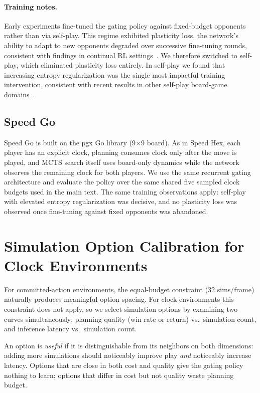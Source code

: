 \paragraph{Training notes.}
Early experiments fine-tuned the gating policy against fixed-budget opponents rather
than via self-play.
This regime exhibited plasticity loss, the network's ability to adapt to new opponents
degraded over successive fine-tuning rounds, consistent with findings in continual RL
settings~\citep{muppidi2024fast, boopathy2024permutation}.
We therefore switched to self-play, which eliminated plasticity loss entirely.
In self-play we found that increasing entropy regularization was the single most
impactful training intervention, consistent with recent results in other self-play
board-game domains~\citep{forkel2025entropy}.

\subsection{Speed Go}
Speed Go is built on the pgx Go library (9$\times$9 board).
As in Speed Hex, each player has an explicit clock, planning consumes clock only
after the move is played, and MCTS search itself uses board-only dynamics while the
network observes the remaining clock for both players.
We use the same recurrent gating architecture and evaluate the policy over the same
shared five sampled clock budgets used in the main text.
The same training observations apply: self-play with elevated entropy regularization
was decisive, and no plasticity loss was observed once fine-tuning against fixed
opponents was abandoned.


\section{Simulation Option Calibration for Clock Environments}
\label{app:sim_calibration}

For committed-action environments, the equal-budget constraint (32 sims/frame) naturally
produces meaningful option spacing.
For clock environments this constraint does not apply, so we select simulation options
by examining two curves simultaneously: planning quality (win rate or return) vs.\
simulation count, and inference latency vs.\ simulation count.

An option is \emph{useful} if it is distinguishable from its neighbors on both dimensions:
adding more simulations should noticeably improve play \emph{and} noticeably increase
latency.
Options that are close in both cost and quality give the gating policy nothing to learn;
options that differ in cost but not quality waste planning budget.


